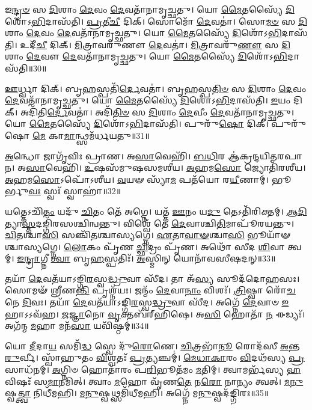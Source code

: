    𑌇\-\ul{𑌨𑍍𑌦𑍍𑌰}\-\-\ul{𑍞} 𑌸 \ul{𑌦𑌿}\-𑌶𑌾𑌂 \ul{𑌦𑍇}\-𑌵𑌂 \ul{𑌦𑍇}\-𑌵𑌤𑌾᳴𑌨𑌾𑌮𑍃𑌚𑍍𑌛𑌤𑍁।
   𑌯𑍋 \ul{𑌮𑍈}\-𑌤𑌸𑍍𑌯𑍈᳴ \ul{𑌦𑌿}\-𑌶𑍋᳴𑌽\-\ul{𑌭𑌿}\-𑌦𑌾𑌸᳴𑌤𑌿।
   \ul{𑌪𑍍𑌰}\-𑌤𑍀\-\ul{𑌚𑍀} 𑌦𑌿𑌕𑍍।
   𑌸𑍋𑌮𑍋᳴ \ul{𑌦𑍇}\-𑌵𑌤𑌾॑।
   𑌸𑍋\-\ul{𑌮}\-\-\ul{𑍞} 𑌸 \ul{𑌦𑌿}\-𑌶𑌾𑌂 \ul{𑌦𑍇}\-𑌵𑌂 \ul{𑌦𑍇}\-𑌵𑌤𑌾᳴𑌨𑌾𑌮𑍃𑌚𑍍𑌛𑌤𑍁।
   𑌯𑍋 \ul{𑌮𑍈}\-𑌤𑌸𑍍𑌯𑍈᳴ \ul{𑌦𑌿}\-𑌶𑍋᳴𑌽\-\ul{𑌭𑌿}\-𑌦𑌾𑌸᳴𑌤𑌿।
   𑌉𑌦𑍀᳴\-\ul{𑌚𑍀} 𑌦𑌿𑌕𑍍।
   \ul{𑌮𑌿}\-𑌤𑍍𑌰𑌾𑌵𑌰𑍁᳴𑌣𑍗 \ul{𑌦𑍇}\-𑌵𑌤𑌾॑।
   \ul{𑌮𑌿}\-𑌤𑍍𑌰𑌾𑌵𑌰𑍁᳴\-\ul{𑌣𑍗} 𑌸 \ul{𑌦𑌿}\-𑌶𑌾𑌂 \ul{𑌦𑍇}\-𑌵𑍗 \ul{𑌦𑍇}\-𑌵𑌤𑌾᳴𑌨𑌾𑌮𑍃𑌚𑍍𑌛𑌤𑍁।
   𑌯𑍋 \ul{𑌮𑍈}\-𑌤𑌸𑍍𑌯𑍈᳴ \ul{𑌦𑌿}\-𑌶𑍋᳴𑌽\-\ul{𑌭𑌿}\-𑌦𑌾𑌸᳴𑌤𑌿॥30॥

   \ul{𑌊}\-𑌰𑍍𑌧𑍍𑌵𑌾 𑌦𑌿𑌕𑍍।
   𑌬𑍃\-\ul{𑌹}\-𑌸𑍍𑌪𑌤𑌿᳴\-\ul{𑌰𑍍𑌦𑍇}\-𑌵𑌤𑌾॑।
   𑌬𑍃\-\ul{𑌹}\-𑌸𑍍𑌪\-\ul{𑌤𑌿}\-\-\ul{𑍞} 𑌸 \ul{𑌦𑌿}\-𑌶𑌾𑌂 \ul{𑌦𑍇}\-𑌵𑌂 \ul{𑌦𑍇}\-𑌵𑌤𑌾᳴𑌨𑌾𑌮𑍃𑌚𑍍𑌛𑌤𑍁।
   𑌯𑍋 \ul{𑌮𑍈}\-𑌤𑌸𑍍𑌯𑍈᳴ \ul{𑌦𑌿}\-𑌶𑍋᳴𑌽\-\ul{𑌭𑌿}\-𑌦𑌾𑌸᳴𑌤𑌿।
   \ul{𑌇}\-𑌯𑌂 𑌦𑌿𑌕𑍍।
   𑌅𑌦𑌿᳴𑌤𑌿\-\ul{𑌰𑍍𑌦𑍇}\-𑌵𑌤𑌾॑।
   𑌅𑌦𑌿᳴\-\ul{𑌤𑌿}\-\-\ul{𑍞} 𑌸 \ul{𑌦𑌿}\-𑌶𑌾𑌂 \ul{𑌦𑍇}\-𑌵𑍀𑌂 \ul{𑌦𑍇}\-𑌵𑌤𑌾᳴𑌨𑌾𑌮𑍃𑌚𑍍𑌛𑌤𑍁।
   𑌯𑍋 \ul{𑌮𑍈}\-𑌤𑌸𑍍𑌯𑍈᳴ \ul{𑌦𑌿}\-𑌶𑍋᳴𑌽\-\ul{𑌭𑌿}\-𑌦𑌾𑌸᳴𑌤𑌿।
   𑌪𑍁𑌰𑍁᳴\-\ul{𑌷𑍋} 𑌦𑌿𑌕𑍍।
   𑌪𑍁𑌰𑍁᳴𑌷𑍋 \ul{𑌮𑍇} 𑌕𑌾\-\ul{𑌮𑌾}\-𑌨𑍍𑌥𑍍𑌸𑌮᳴𑌰𑍍𑌧𑌯𑌤𑍁॥31॥
   
   \ul{𑌅}\-𑌨𑍍𑌧𑍋 𑌜𑌾𑌗𑍃᳴𑌵𑌿𑌃 𑌪𑍍𑌰𑌾𑌣।
   𑌅\-\ul{𑌸𑌾}\-𑌵𑍇𑌹𑌿᳴।
   \ul{𑌬}\-\-\ul{𑌧𑌿}\-𑌰 𑌆॑𑌕𑍍𑌰𑌨𑍍𑌦𑌯𑌿𑌤𑌰𑌪𑌾𑌨।
   𑌅\-\ul{𑌸𑌾}\-𑌵𑍇𑌹𑌿᳴।
   \ul{𑌉}\-𑌷𑌸᳴𑌮𑍁𑌷𑌸𑌮𑌶𑍀𑌯।
   \ul{𑌅}\-𑌹𑌮\-\ul{𑌸𑍋} 𑌜𑍍𑌯𑍋𑌤𑌿᳴𑌰𑌶𑍀𑌯।
   \ul{𑌅}\-𑌹𑌮\-\ul{𑌸𑍋}\-𑌽𑌪𑍋᳴𑌽𑌶𑍀𑌯।
   \ul{𑌵}\-𑌯𑍟 𑌸𑍍𑌯𑌾᳴\-\ul{𑌮} 𑌪𑌤᳴𑌯𑍋 𑌰\-\ul{𑌯𑍀}\-𑌣𑌾𑌮𑍍।
   𑌭𑍂𑌰𑍍𑌭𑍁\-\ul{𑌵𑌃} 𑌸𑍍𑌵𑌃᳴ 𑌸𑍍𑌵𑌾𑌹𑌾॑॥32॥
\anuvakamend
  
   𑌯𑌤𑍍𑌤𑍇𑌽𑌚𑌿᳴\-\ul{𑌤𑌂} 𑌯𑌦𑍁᳴ \ul{𑌚𑌿}\-𑌤𑌂 𑌤𑍇᳴ 𑌅𑌗𑍍𑌨𑍇।
   𑌯𑌤𑍍𑌤᳴ \ul{𑌊}\-𑌨𑌂 𑌯\-\ul{𑌦𑍁} 𑌤𑍇𑌽𑌤𑌿᳴𑌰𑌿𑌕𑍍𑌤𑌮𑍍।
   \ul{𑌆}\-\-\ul{𑌦𑌿}\-𑌤𑍍𑌯𑌾\-\ul{𑌸𑍍𑌤}\-𑌦𑌙𑍍𑌗𑌿᳴𑌰𑌸𑌶𑍍𑌚𑌿𑌨𑍍𑌵𑌨𑍍𑌤𑍁।
   𑌵𑌿𑌶𑍍𑌵𑍇᳴ 𑌤𑍇 \ul{𑌦𑍇}\-𑌵𑌾𑌶𑍍𑌚𑌿\-\ul{𑌤𑌿}\-𑌮𑌾𑌪𑍂᳴𑌰𑌯𑌨𑍍𑌤𑍁।
   \ul{𑌚𑌿}\-𑌤𑌶𑍍𑌚𑌾\-\ul{𑌸𑌿} 𑌸𑌞𑍍𑌚𑌿᳴𑌤𑌶𑍍𑌚𑌾𑌸𑍍𑌯𑌗𑍍𑌨𑍇।
   \ul{𑌏}\-𑌤𑌾\-\ul{𑌵𑌾}\-\-\ul{𑍟}\-𑌶𑍍𑌚𑌾\-\ul{𑌸𑌿} 𑌭𑍂𑌯𑌾᳴𑍟𑌶𑍍𑌚𑌾𑌸𑍍𑌯𑌗𑍍𑌨𑍇।
   \ul{𑌲𑍋}\-𑌕𑌂 𑌪𑍃᳴𑌣 \ul{𑌚𑍍𑌛𑌿}\-𑌦𑍍𑌰𑌂 𑌪𑍃᳴𑌣।
   𑌅𑌥𑍋᳴ 𑌸𑍀𑌦 \ul{𑌶𑌿}\-𑌵𑌾 𑌤𑍍𑌵𑌮𑍍।
   \ul{𑌇}\-\-\ul{𑌨𑍍𑌦𑍍𑌰𑌾}\-𑌗𑍍𑌨𑍀 \ul{𑌤𑍍𑌵𑌾} 𑌬𑍃\-\ul{𑌹}\-𑌸𑍍𑌪𑌤𑌿𑌃᳴।
   \ul{𑌅}\-𑌸𑍍𑌮𑌿𑌨𑍍 𑌯𑍋𑌨𑌾᳴𑌵𑌸𑍀𑌷𑌦𑌨𑍍॥33॥

   𑌤𑌯𑌾᳴ \ul{𑌦𑍇}\-𑌵𑌤᳴𑌯𑌾𑌽𑌙𑍍𑌗𑌿\-\ul{𑌰}\-𑌸𑍍𑌵\-\ul{𑌦𑍍𑌧𑍍𑌰𑍁}\-𑌵𑌾 𑌸𑍀᳴𑌦।
   𑌤𑌾 𑌅᳴\-\ul{𑌸𑍍𑌯} 𑌸𑍂𑌦᳴𑌦𑍋𑌹𑌸𑌃।
   𑌸𑍋𑌮𑍟᳴ 𑌶𑍍𑌰𑍀𑌣\-\ul{𑌨𑍍𑌤𑌿} 𑌪𑍃𑌶𑍍𑌨᳴𑌯𑌃।
   𑌜𑌨𑍍𑌮𑌂᳴ \ul{𑌦𑍇}\-𑌵𑌾\-\ul{𑌨𑌾𑌂} 𑌵𑌿𑌶𑌃᳴।
   \ul{𑌤𑍍𑌰𑌿}\-𑌷𑍍𑌵𑌾 𑌰𑍋᳴\-\ul{𑌚}\-𑌨𑍇 \ul{𑌦𑌿}\-𑌵𑌃।
   𑌤𑌯𑌾᳴ \ul{𑌦𑍇}\-𑌵𑌤᳴𑌯𑌾𑌽𑌙𑍍𑌗𑌿\-\ul{𑌰}\-𑌸𑍍𑌵\-\ul{𑌦𑍍𑌧𑍍𑌰𑍁}\-𑌵𑌾 𑌸𑍀᳴𑌦।
   𑌅𑌗𑍍𑌨𑍇᳴ \ul{𑌦𑍇}\-𑌵𑌾𑍞 \ul{𑌇}\-𑌹𑌾𑌽𑌽𑌵᳴𑌹।
   \ul{𑌜}\-\-\ul{𑌜𑍍𑌞𑌾}\-𑌨𑍋 \ul{𑌵𑍃}\-𑌕𑍍𑌤𑌬᳴𑌰𑍍{‌}𑌹𑌿𑌷𑍇।
   𑌅\-\ul{𑌸𑌿} 𑌹𑍋𑌤𑌾᳴ \ul{𑌨} 𑌈𑌡𑍍𑌯𑌃᳴।
   𑌅𑌗᳴𑌨𑍍𑌮 \ul{𑌮}\-𑌹𑌾 𑌮𑌨᳴\-\ul{𑌸𑌾} 𑌯𑌵𑌿᳴𑌷𑍍𑌠𑌮𑍍॥34॥

   𑌯𑍋 \ul{𑌦𑍀}\-𑌦𑌾\-\ul{𑌯} 𑌸𑌮𑌿᳴\-\ul{𑌦𑍍𑌧} 𑌸𑍍𑌵𑍇 𑌦𑍁᳴\-\ul{𑌰𑍋}\-𑌣𑍇।
   \ul{𑌚𑌿}\-𑌤𑍍𑌰𑌭𑌾᳴\-\ul{𑌨𑍂} 𑌰𑍋𑌦᳴𑌸𑍀 \ul{𑌅}\-𑌨𑍍𑌤\-\ul{𑌰𑍁}\-𑌰𑍍𑌵𑍀।
   𑌸𑍍𑌵𑌾᳴𑌹𑍁𑌤𑌂 \ul{𑌵𑌿}\-𑌶𑍍𑌵𑌤𑌃᳴ \ul{𑌪𑍍𑌰}\-𑌤𑍍𑌯𑌞𑍍𑌚𑌮𑍍॑।
   \ul{𑌮𑍇}\-\-\ul{𑌧𑌾}\-\-\ul{𑌕𑌾}\-𑌰𑌂 \ul{𑌵𑌿}\-𑌦𑌥᳴𑌸𑍍𑌯 \ul{𑌪𑍍𑌰}\-𑌸𑌾𑌧᳴𑌨𑌮𑍍।
   \ul{𑌅}\-𑌗𑍍𑌨𑌿𑍞 𑌹𑍋𑌤𑌾᳴𑌰𑌂 𑌪\-\ul{𑌰𑌿}\-𑌭𑍂𑌤᳴𑌮𑌂 \ul{𑌮}\-𑌤𑌿𑌮𑍍।
   𑌤𑍍𑌵𑌾𑌮𑌰𑍍𑌭᳴𑌸𑍍𑌯 \ul{𑌹}\-𑌵𑌿𑌷𑌃᳴ 𑌸\-\ul{𑌮𑌾}\-𑌨𑌮𑌿𑌤𑍍।
   𑌤𑍍𑌵𑌾𑌂 \ul{𑌮}\-𑌹𑍋 𑌵𑍃᳴𑌣\-\ul{𑌤𑍇} 𑌨\-\ul{𑌰𑍋} 𑌨𑌾𑌨𑍍𑌯𑌂 𑌤𑍍𑌵𑌤𑍍।
   \ul{𑌮}\-\-\ul{𑌨𑍁}\-𑌷𑍍𑌵\-\ul{𑌤𑍍𑌤𑍍𑌵𑌾} 𑌨𑌿𑌧𑍀᳴𑌮𑌹𑌿।
   \ul{𑌮}\-\-\ul{𑌨𑍁}\-𑌷𑍍𑌵𑌥𑍍𑌸𑌮𑌿᳴𑌧𑍀𑌮𑌹𑌿।
   𑌅𑌗𑍍𑌨𑍇᳴ 𑌮\-\ul{𑌨𑍁}\-𑌷𑍍𑌵𑌦᳴𑌙𑍍𑌗𑌿𑌰𑌃॥35॥

